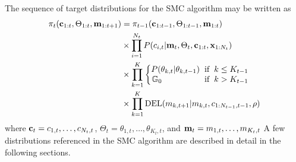 \documentclass[smallcondensed, final]{svjour3}
\begin{document}
The sequence of target distributions for the SMC algorithm may be written as
\begin{equation}
\begin{split}
\pi_{t}(\bold{c}_{1:t}, \Theta_{1:t}, \bold{m}_{1:t+1}) & =  \pi_{t-1}(\bold{c}_{1:t-1}, \Theta_{1:t-1}, \bold{m}_{1:t})\\
& \times \prod_{i=1}^{N_{t}} P(c_{i,t} | \bold{m}_{t}, \Theta_{t}, \bold{c}_{1:t}, \bold{x}_{1:N_{t}}) \\
& \times \prod_{k=1}^{K} 
\begin{cases}
\begin{split}
P(\theta_{k,t} | \theta_{k,t-1}) \hspace{2mm} & \text{if} \hspace{2mm} k \leq K_{t-1} \\
\mathbb{G}_{0} \hspace{18mm} & \text{if} \hspace{2mm} k > K_{t-1}
\end{split}
\end{cases} \\
& \times \prod_{k=1}^{K} \text{DEL}(m_{k,t+1} | m_{k,t}, c_{1:N_{t-1}, t-1}, \rho)
\end{split}
\end{equation}
where $\bold{c}_{t} = c_{1,t}, \ldots, c_{N_{t}, t}$, $\Theta_{t} = \theta_{1,t}, \ldots, \theta_{K_{t}, t}$, and $\bold{m}_{t} = m_{1,t}, \ldots, m_{K_{t}, t}$ A few distributions referenced in the SMC algorithm are described in detail in the following sections.
\end{document}
